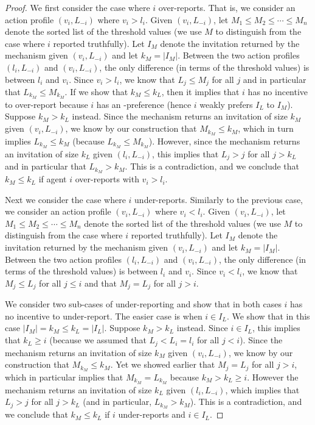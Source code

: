 \begin{proof}
	We first consider the case where $i$ over-reports.  That is, we consider an action profile $(v_i, L_{-i})$ where $v_i > l_i$. Given $(v_i, L_{-i})$, let $M_1 \leq M_2 \leq \cdots \leq M_{n}$ denote the sorted list of the threshold values (we use $M$ to distinguish from the case where $i$ reported truthfully). Let $I_M$ denote the invitation returned by the mechanism given $(v_i, L_{-i})$ and let $k_M = |I_M|$. Between the two action profiles $(l_i, L_{-i})$ and $(v_i, L_{-i})$, the only difference (in terms of the threshold values) is between $l_i$ and $v_i$. Since $v_i > l_i$, we know that $L_j \leq M_j$ for all $j$ and in particular that $L_{k_M} \leq M_{k_M}$. If we show that $k_M \leq k_L$, then it implies that $i$ has no incentive to over-report because $i$ has an \INC-preference (hence $i$ weakly prefers $I_L$ to $I_M$). Suppose $k_M > k_L$ instead. Since the mechanism returns an invitation of size $k_M$ given $(v_i, L_{-i})$, we know by our construction that $M_{k_M} \leq k_M$, which in turn implies $L_{k_M} \leq k_M$ (because $L_{k_M} \leq M_{k_M}$). However, since the mechanism returns an invitation of size $k_L$ given $(l_i, L_{-i})$, this implies that $L_j > j$ for all $j > k_L$ and in particular that $L_{k_M} > k_M$.  This is a contradiction, and we conclude that $k_M \leq k_L$ if agent $i$ over-reports with $v_i > l_i$. 

	Next we consider the case where $i$ under-reports. Similarly to the previous case, we consider an action profile $(v_i, L_{-i})$ where $v_i < l_i$. Given $(v_i, L_{-i})$, let $M_1 \leq M_2 \leq \cdots \leq M_{n}$ denote the sorted list of the threshold values (we use $M$ to distinguish from the case where $i$ reported truthfully). Let $I_M$ denote the invitation returned by the mechanism given $(v_i, L_{-i})$ and let $k_M = |I_M|$. Between the two action profiles $(l_i, L_{-i})$ and $(v_i, L_{-i})$, the only difference (in terms of the threshold values) is between $l_i$ and $v_i$. Since $v_i < l_i$, we know that $M_j \leq L_j$ for all $j \leq i$ and that $M_j = L_j$ for all $j > i$. 

	We consider two sub-cases of under-reporting and show that in both cases $i$ has no incentive to under-report.  The easier case is when $i \in I_L$. We show that in this case $|I_M| = k_M \leq k_L = |I_L|$. Suppose $k_M > k_L$ instead. Since $i \in I_L$, this implies that $k_L \geq i$ (because we assumed that $L_j < L_i = l_i$ for all $j < i$). Since the mechanism returns an invitation of size $k_M$ given $(v_i, L_{-i})$, we know by our construction that $M_{k_M} \leq k_M$. Yet we showed earlier that $M_j = L_j$ for all $j > i$, which in particular implies that $M_{k_M} = L_{k_M}$ because $k_M > k_L \geq i$. However the mechanism returns an invitation of size $k_L$ given $(l_i, L_{-i})$, which implies that $L_j > j$ for all $j > k_L$ (and in particular, $L_{k_M} > k_M$). This is a contradiction, and we conclude that $k_M \leq k_L$ if $i$ under-reports and $i\in I_L$. 


\end{proof}
